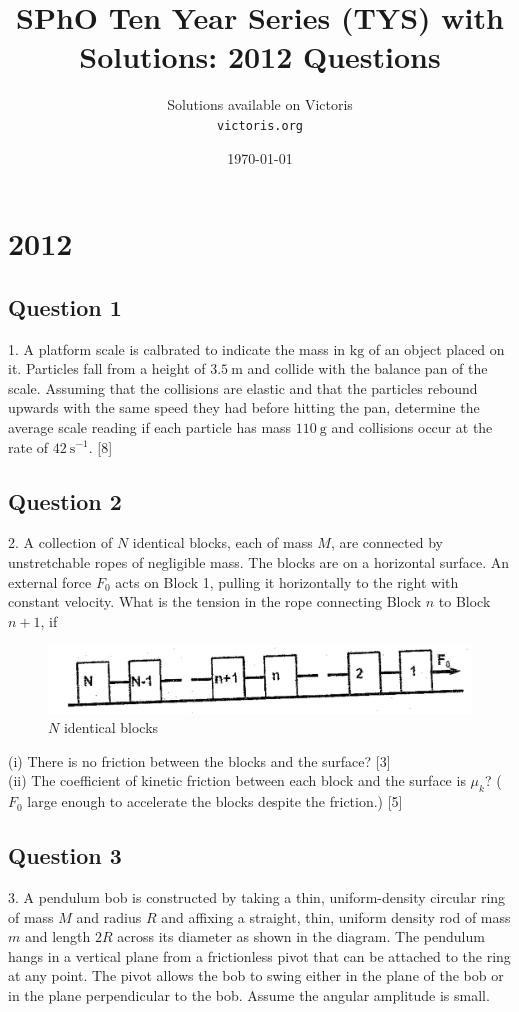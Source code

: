 \documentclass{article}
\title{SPhO Ten Year Series (TYS) with Solutions: 2012 Questions}
\author{
    Solutions available on Victoris\\
    \texttt{victoris.org}
}
\date{\today}
\begin{document}
\maketitle

\section{2012}

\subsection{Question 1}
1. A platform scale is calbrated to indicate the mass in $\mathrm{kg}$ of an object placed on it. Particles fall from a height of $3.5 \mathrm{~m}$ and collide with the balance pan of the scale. Assuming that the collisions are elastic and that the particles rebound upwards with the same speed they had before hitting the pan, determine the average scale reading if each particle has mass $110 \mathrm{~g}$ and collisions occur at the rate of $42 \mathrm{~s}^{-1}$. [8] \\

\subsection{Question 2}
2. A collection of $N$ identical blocks, each of mass $M$, are connected by unstretchable ropes of negligible mass. The blocks are on a horizontal surface. An external force $F_{0}$ acts on Block 1, pulling it horizontally to the right with constant velocity. What is the tension in the rope connecting Block $n$ to Block $n+1$, if
\begin{figure}
	\centering
	\includegraphics[width=0.7\linewidth]{spho_book_TYS_images/2012q1.png}
	\caption{$N$ identical blocks}
\end{figure}
(i) There is no friction between the blocks and the surface? [3] \\
(ii) The coefficient of kinetic friction between each block and the surface is $\mu_{k}$? ( $F_{0}$ large enough to accelerate the blocks despite the friction.) [5] \\

\subsection{Question 3}
3. A pendulum bob is constructed by taking a thin, uniform-density circular ring of mass $M$ and radius $R$ and affixing a straight, thin, uniform density rod of mass ${m}$ and length $2 R$ across its diameter as shown in the diagram. The pendulum hangs in a vertical plane from a frictionless pivot that can be attached to the ring at any point. The pivot allows the bob to swing either in the plane of the bob or in the plane perpendicular to the bob. Assume the angular amplitude is small.
\end{document}
